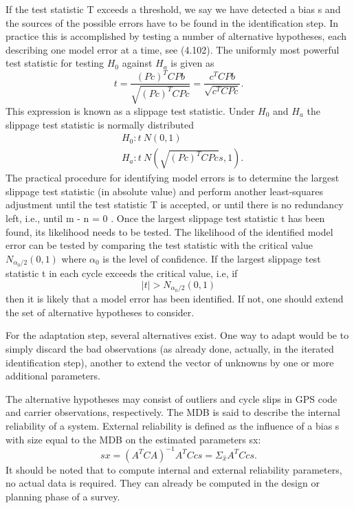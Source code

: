 	If the test statistic T exceeds a threshold, we say we have detected a bias s and
	the sources of the possible errors have to be found in the identification step. In practice
	this is accomplished by testing a number of alternative hypotheses, each describing one
	model error at a time, see (4.102). The uniformly most powerful test statistic for testing
	$H_0$ against $H_a$ is given as
	\begin{equation}
	t=\frac{(Pc)^TCPb}{\sqrt{(Pc)^TCPc}}=\frac{c^TCPb}{\sqrt{c^TCPc}}.
	\end{equation}
	This expression is known as a slippage test statistic. Under $H_0$ and $H_a$ the slippage test
	statistic is normally distributed
	\begin{equation*}
	\begin{split}
	 &H_0:t~N(0,1)   \\
	 &H_a:t~N(\sqrt{(Pc)^TCPc}s,1).
	\end{split}
	\end{equation*}
	The practical procedure for identifying model errors is to determine the largest slippage test statistic (in absolute value) and perform another least-squares adjustment until the
	test statistic T is accepted, or until there is no redundancy left, i.e., until m - n = 0 . Once the largest slippage test statistic t has been found, its likelihood needs to be tested. The	likelihood of the identified model error can be tested by comparing the test statistic with the critical value $N_{\alpha_0/2}(0,1)$ where $\alpha_0$ is the level of confidence. If the largest slippage test statistic t in each cycle exceeds the critical value, i.e, if
	\begin{equation*}
	|t|>N_{\alpha_0/2}(0,1)
	\end{equation*}
	then it is likely that a model error has been identified. If not, one should extend the set of alternative hypotheses to consider.
	
	For the adaptation step, several alternatives exist. One way to adapt would be to
	simply discard the bad observations (as already done, actually, in the iterated identification
	step), another to extend the vector of unknowns by one or more additional parameters.
	
	The alternative hypotheses may consist of outliers and cycle slips in GPS code and
	carrier observations, respectively. The MDB is said to describe the internal reliability of
	a system. External reliability is defined as the influence of a bias s with size equal to the
	MDB on the estimated parameters sx:
	\begin{equation*}
	sx=(A^TCA)^{-1}A^TCcs=\Sigma_{\hat{x}}A^TCcs.
	\end{equation*} 
	It should be noted that to compute internal and external reliability parameters, no actual
	data is required. They can already be computed in the design or planning phase of a survey.
	
